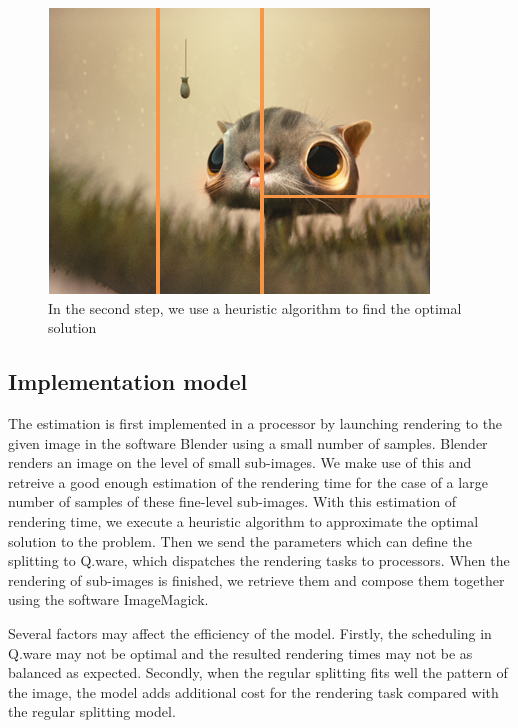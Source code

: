 \documentclass[10pt, conference, compsocconf]{IEEEtran}
\begin{document}
\begin{figure}[htbp]
\centerline{\includegraphics{decou_irre}}
\caption{In the second step, we use a heuristic algorithm to find the optimal solution}
\label{decou_irre}
\end{figure}

\subsection{Implementation model}

The estimation is first implemented in a processor by launching rendering to the given image in the software Blender using a small number of samples. Blender renders an image on the level of small sub-images. We make use of this and retreive a good enough estimation of the rendering time for the case of a large number of samples of these fine-level sub-images. With this estimation of rendering time, we execute a heuristic algorithm to approximate the optimal solution to the problem. Then we send the parameters which can define the splitting to Q.ware, which dispatches the rendering tasks to processors. When the rendering of sub-images is finished, we retrieve them and compose them together using the software ImageMagick.

Several factors may affect the efficiency of the model. Firstly, the scheduling in Q.ware may not be optimal and the resulted rendering times may not be as balanced as expected. Secondly, when the regular splitting fits well the pattern of the image, the model adds additional cost for the rendering task compared with the regular splitting model. 
\end{document}

